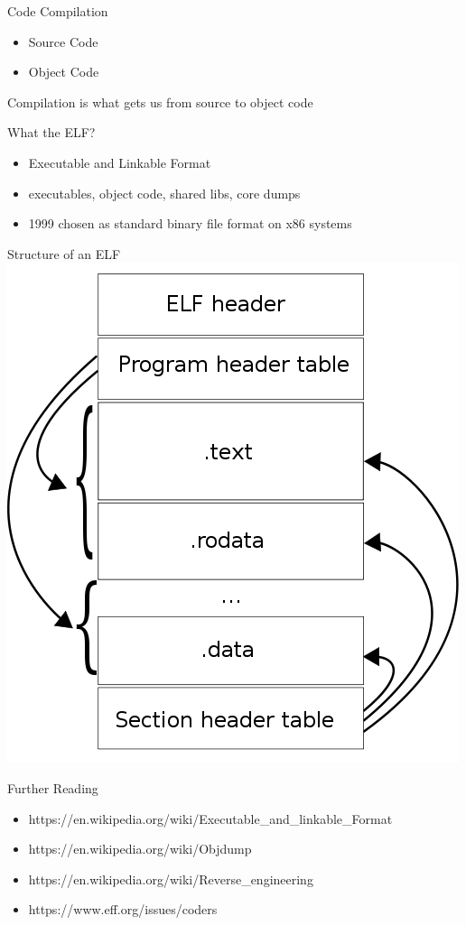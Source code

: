 \documentclass[11pt]{beamer}
\begin{document}
\begin{frame}{Code Compilation}
  \begin{itemize}
    \item Source Code
    \item Object Code
  \end{itemize}
  Compilation is what gets us from source to object code
\end{frame}

\begin{frame}{What the ELF?}
  \begin{itemize}
    \item Executable and Linkable Format
    \item executables, object code, shared libs, core dumps
    \item 1999 chosen as standard binary file format on x86 systems
  \end{itemize}
\end{frame}

\begin{frame}{Structure of an ELF}
  \includegraphics[keepaspectratio=true,width=\framewidth]{Elf-layout.png}
\end{frame}

\begin{frame}{Further Reading}
  \begin{itemize}
    \item
      https://en.wikipedia.org/wiki/Executable\_and\_linkable\_Format
    \item https://en.wikipedia.org/wiki/Objdump
    \item https://en.wikipedia.org/wiki/Reverse\_engineering
    \item https://www.eff.org/issues/coders
  \end{itemize}
\end{frame}
\end{document}
